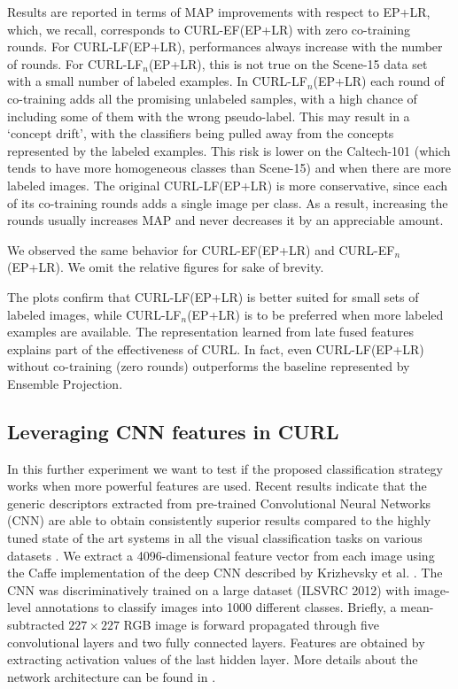 \documentclass[journal,11pt]{IEEEtran}
\newcommand{\ADD}[1]{#1}
\newcommand{\coso}{strategy}
\newcommand{\curlef}{CURL-EF(EP+LR)}
\newcommand{\curllf}{CURL-LF(EP+LR)}
\newcommand{\curlefn}{CURL-EF$_n$(EP+LR)}
\newcommand{\curllfn}{CURL-LF$_n$(EP+LR)}
\begin{document}
%
Results are reported in terms of MAP
improvements with respect to EP\ADD{+LR}, which, we recall, corresponds to
\curlef{ }with zero co-training rounds. For \curllf, performances always
increase with the number of rounds. For \curllfn, this is not true on
the Scene-15 data set with a small number of labeled examples.  In
\curllfn{ }each round of co-training adds all the promising unlabeled
samples, with a high chance of including some of them with the wrong
pseudo-label. This may result in a `concept drift', with the
classifiers being pulled away from the concepts represented by the
labeled examples.  This risk is lower on the Caltech-101 (which tends
to have more homogeneous classes than Scene-15) and when there are
more labeled images. The original \curllf{ }is more conservative, since
each of its co-training rounds adds a single image per class.  As a
result, increasing the rounds usually increases MAP and never decreases it by an
appreciable amount.

We observed the same behavior for \curlef{ }and \curlefn. We omit the relative figures for sake of brevity. %

%
The plots confirm that \curllf{ }is better suited for small sets of
labeled images, while \curllfn{ }is to be preferred when more labeled
examples are available. The representation learned from late fused
features explains part of the effectiveness of CURL. In fact, even
\curllf{ }without co-training (zero rounds) outperforms the baseline
represented by Ensemble Projection.



\subsection{Leveraging CNN features in CURL}
\label{subsec:cnn}
In this further experiment we want to test if the proposed classification \coso{ }works when more powerful features are used. Recent results indicate that the generic descriptors extracted from pre-trained Convolutional Neural Networks (CNN) are able to obtain consistently superior results compared to the highly tuned state of the art systems in all the visual classification tasks on various datasets \cite{razavian2014cnn}.
We extract a 4096-dimensional feature vector from each image using the Caffe \cite{jia2014caffe} implementation of the deep CNN described by Krizhevsky et al. \cite{krizhevsky2012imagenet}.
The CNN was discriminatively trained on a large dataset (ILSVRC 2012) with image-level annotations to classify images into 1000 different classes.
Briefly, a mean-subtracted $227 \times 227$ RGB image is forward propagated through five convolutional layers and two fully connected layers. Features are obtained by extracting activation values of the last hidden layer. More details about the network architecture can be found in \cite{krizhevsky2012imagenet,jia2014caffe}.
\end{document}
